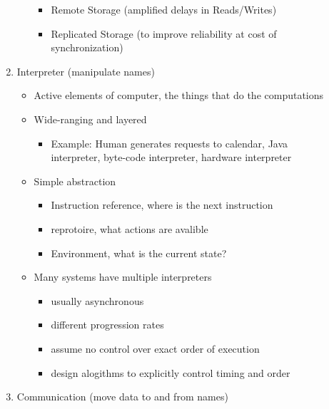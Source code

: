 \documentclass{report}
\begin{document}
\begin{description}
\begin{enumerate}
\begin{itemize}
\begin{itemize}
                            \item Remote Storage (amplified delays in Reads/Writes)
                            \item Replicated Storage (to improve reliability at cost of synchronization)
                        \end{itemize}
                \end{itemize}
            \item Interpreter (manipulate names)
                \begin{itemize}
                    \item Active elements of computer, the things that do the computations
                    \item Wide-ranging and layered
                        \begin{itemize}
                            \item Example: Human generates requests to calendar, Java interpreter,
                                 byte-code interpreter, hardware interpreter
                        \end{itemize}
                    \item Simple abstraction
                        \begin{itemize}
                            \item Instruction reference, where is the next instruction
                            \item reprotoire, what actions are avalible
                            \item Environment, what is the current state?
                        \end{itemize}
                    \item Many systems have multiple interpreters
                        \begin{itemize}
                            \item usually asynchronous
                            \item different progression rates
                            \item assume no control over exact order of execution
                            \item design alogithms to explicitly control timing and order
                        \end{itemize}
                \end{itemize}
            \item Communication (move data to and from names)

\end{enumerate}
\end{description}
\end{document}
